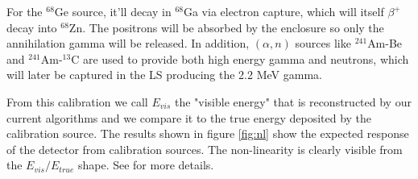 For the $^{68}$Ge source, it'll decay in $^{68}$Ga via electron capture, which will itself $\beta^+$ decay into $^{68}$Zn. The positrons will be absorbed by the enclosure so only the annihilation gamma will be released. In addition, $(\alpha, n)$ sources like $^{241}$Am-Be and $^{241}$Am-$^{13}$C are used to provide both high energy gamma and neutrons, which will later be captured in the LS producing the 2.2 MeV gamma.

From this calibration we call $E_{vis}$ the "visible energy" that is reconstructed by our current algorithms and we compare it to the true energy deposited by the calibration source. The results shown in figure \ref{fig:nl} show the expected response of the detector from calibration sources. The non-linearity is clearly visible from the $E_{vis} / E_{true}$ shape. See \cite{juno_collaboration_calibration_2021} for more details.

